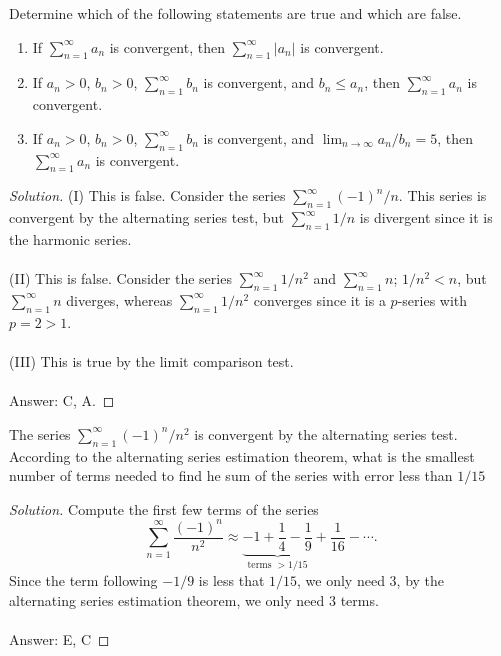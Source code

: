 \begin{problem}
Determine which of the following statements are true and which are false.
\begin{enumerate}[label=(\MakeUppercase{\roman*})]
\item If $\sum_{n=1}^\infty a_n$ is convergent, then
  $\sum_{n=1}^\infty|a_n|$ is convergent.
\item If $a_n>0$, $b_n>0$, $\sum_{n=1}^\infty b_n$ is convergent, and
  $b_n\leq a_n$, then $\sum_{n=1}^\infty a_n$ is convergent.
\item If $a_n>0$, $b_n>0$, $\sum_{n=1}^\infty b_n$ is convergent, and
  $\lim_{n\to\infty} a_n/b_n=5$, then $\sum_{n=1}^\infty a_n$ is convergent.
\end{enumerate}
\end{problem}
\begin{proof}[Solution]
(I) This is false. Consider the series $\sum_{n=1}^\infty(-1)^n/n$. This
series is convergent by the alternating series test, but $\sum_{n=1}^\infty
1/n$ is divergent since it is the harmonic series.
\\\\
(II) This is false. Consider the series $\sum_{n=1}^\infty1/n^2$ and
$\sum_{n=1}^\infty n$; $1/n^2<n$, but $\sum_{n=1}^\infty n$ diverges,
whereas $\sum_{n=1}^\infty 1/n^2$ converges since it is a $p$-series with
$p=2>1$.
\\\\
(III) This is true by the limit comparison test.
\\\\
Answer: {\color{Green} C}, {\color{Red} A}.
\end{proof}

\begin{problem}
The series $\sum_{n=1}^\infty (-1)^n/n^2$ is convergent by the alternating
series test. According to the alternating series estimation theorem, what
is the smallest number of terms needed to find he sum of the series with
error less than $1/15$
\end{problem}
\begin{proof}[Solution]
Compute the first few terms of the series
\[
\sum_{n=1}^\infty\frac{(-1)^n}{n^2}\approx
\underbrace{-1+\frac{1}{4}-\frac{1}{9}}_{\text{terms $>1/15$}}+\frac{1}{16}-\cdots.
\]
Since the term following $-1/9$ is less that $1/15$, we only need $3$, by
the alternating series estimation theorem, we only need $3$ terms.
\\\\
Answer: {\color{Green} E}, {\color{Red} C}
\end{proof}

